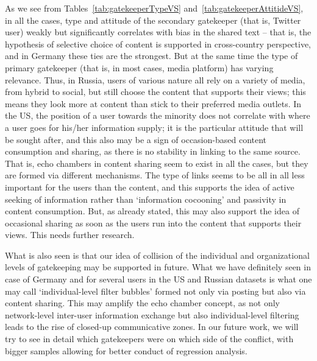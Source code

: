 As we see from Tables~\cref{tab:gatekeeperTypeVS} and~\cref{tab:gatekeeperAttitideVS}, in all the cases, type and attitude of the secondary gatekeeper (that is, Twitter user) weakly but significantly correlates with bias in the shared text -- that is, the hypothesis of selective choice of content is supported in cross-country perspective, and in Germany these ties are the strongest. But at the same time the type of primary gatekeeper (that is, in most cases, media platform) has varying relevance. Thus, in Russia, users of various nature all rely on a variety of media, from hybrid to social, but still choose the content that supports their views; this means they look more at content than stick to their preferred media outlets. In the US, the position of a user towards the minority does not correlate with where a user goes for his/her information supply; it is the particular attitude that will be sought after, and this also may be a sign of occasion-based content consumption and sharing, as there is no stability in linking to the same source. That is, echo chambers in content sharing seem to exist in all the cases, but they are formed via different mechanisms. The type of links seems to be all in all less important for the users than the content, and this supports the idea of active seeking of information rather than ‘information cocooning’ and passivity in content consumption. But, as already stated, this may also support the idea of occasional sharing as soon as the users run into the content that supports their views. This needs further research.

What is also seen is that our idea of collision of the individual and organizational levels of gatekeeping may be supported in future. What we have definitely seen in case of Germany and for several users in the US and Russian datasets is what one may call ‘individual-level filter bubbles’ formed not only via posting but also via content sharing. This may amplify the echo chamber concept, as not only network-level inter-user information exchange but also individual-level filtering leads to the rise of closed-up communicative zones. In our future work, we will try to see in detail which gatekeepers were on which side of the conflict, with bigger samples allowing for better conduct of regression analysis.

